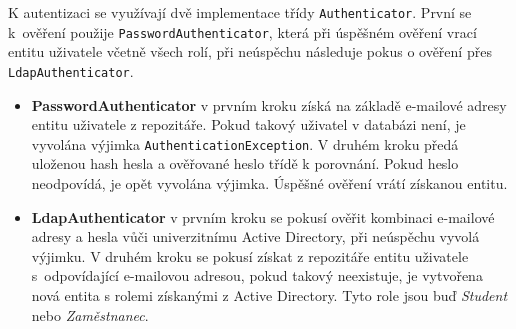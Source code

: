 K autentizaci se využívají dvě implementace třídy \texttt{Authenticator}. První se k~ověření použije \texttt{PasswordAuthenticator}, která při úspěšném ověření vrací entitu uživatele včetně všech rolí, při neúspěchu následuje pokus o ověření přes \texttt{LdapAuthenticator}.

\begin{itemize}
	\item \textbf{PasswordAuthenticator} v prvním kroku získá na základě e-mailové adresy entitu uživatele z repozitáře. Pokud takový uživatel v databázi není, je vyvolána výjimka \texttt{AuthenticationException}. V druhém kroku předá uloženou hash hesla a ověřované heslo třídě  k porovnání. Pokud heslo neodpovídá, je opět vyvolána výjimka. Úspěšné ověření vrátí získanou entitu.
	\item \textbf{LdapAuthenticator} v prvním kroku se pokusí ověřit kombinaci e-mailové adresy a hesla vůči univerzitnímu Active Directory, při neúspěchu vyvolá výjimku. V druhém kroku se pokusí získat z repozitáře entitu uživatele s~odpovídající e-mailovou adresou, pokud takový neexistuje, je vytvořena nová entita s rolemi získanými z Active Directory. Tyto role jsou buď \textit{Student} nebo \textit{Zaměstnanec}.
\end{itemize}

